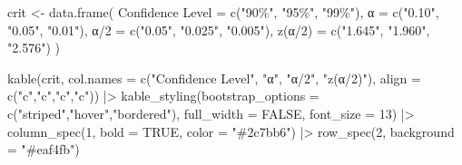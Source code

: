 \documentclass[
  12pt,
  letterpaper,
]{book}
\newenvironment{Shaded}{\begin{snugshade}}{\end{snugshade}}
\newcommand{\AttributeTok}[1]{\textcolor[rgb]{0.40,0.45,0.13}{#1}}
\newcommand{\ConstantTok}[1]{\textcolor[rgb]{0.56,0.35,0.01}{#1}}
\newcommand{\DecValTok}[1]{\textcolor[rgb]{0.68,0.00,0.00}{#1}}
\newcommand{\FunctionTok}[1]{\textcolor[rgb]{0.28,0.35,0.67}{#1}}
\newcommand{\NormalTok}[1]{\textcolor[rgb]{0.00,0.23,0.31}{#1}}
\newcommand{\OtherTok}[1]{\textcolor[rgb]{0.00,0.23,0.31}{#1}}
\newcommand{\SpecialCharTok}[1]{\textcolor[rgb]{0.37,0.37,0.37}{#1}}
\newcommand{\StringTok}[1]{\textcolor[rgb]{0.13,0.47,0.30}{#1}}
\begin{document}
\begin{Shaded}
\begin{Highlighting}[]
\NormalTok{crit }\OtherTok{\textless{}{-}} \FunctionTok{data.frame}\NormalTok{(}
  \StringTok{\textasciigrave{}}\AttributeTok{Confidence Level}\StringTok{\textasciigrave{}} \OtherTok{=} \FunctionTok{c}\NormalTok{(}\StringTok{"90\%"}\NormalTok{, }\StringTok{"95\%"}\NormalTok{, }\StringTok{"99\%"}\NormalTok{),}
  \StringTok{\textasciigrave{}}\AttributeTok{α}\StringTok{\textasciigrave{}} \OtherTok{=} \FunctionTok{c}\NormalTok{(}\StringTok{"0.10"}\NormalTok{, }\StringTok{"0.05"}\NormalTok{, }\StringTok{"0.01"}\NormalTok{),}
  \StringTok{\textasciigrave{}}\AttributeTok{α/2}\StringTok{\textasciigrave{}} \OtherTok{=} \FunctionTok{c}\NormalTok{(}\StringTok{"0.05"}\NormalTok{, }\StringTok{"0.025"}\NormalTok{, }\StringTok{"0.005"}\NormalTok{),}
  \StringTok{\textasciigrave{}}\AttributeTok{z(α/2)}\StringTok{\textasciigrave{}} \OtherTok{=} \FunctionTok{c}\NormalTok{(}\StringTok{"1.645"}\NormalTok{, }\StringTok{"1.960"}\NormalTok{, }\StringTok{"2.576"}\NormalTok{)}
\NormalTok{)}

\FunctionTok{kable}\NormalTok{(crit,}
      \AttributeTok{col.names =} \FunctionTok{c}\NormalTok{(}\StringTok{"Confidence Level"}\NormalTok{, }\StringTok{"α"}\NormalTok{, }\StringTok{"α/2"}\NormalTok{, }\StringTok{"z(α/2)"}\NormalTok{),}
      \AttributeTok{align =} \FunctionTok{c}\NormalTok{(}\StringTok{"c"}\NormalTok{,}\StringTok{"c"}\NormalTok{,}\StringTok{"c"}\NormalTok{,}\StringTok{"c"}\NormalTok{)) }\SpecialCharTok{|\textgreater{}}
  \FunctionTok{kable\_styling}\NormalTok{(}\AttributeTok{bootstrap\_options =} \FunctionTok{c}\NormalTok{(}\StringTok{"striped"}\NormalTok{,}\StringTok{"hover"}\NormalTok{,}\StringTok{"bordered"}\NormalTok{),}
                \AttributeTok{full\_width =} \ConstantTok{FALSE}\NormalTok{, }\AttributeTok{font\_size =} \DecValTok{13}\NormalTok{) }\SpecialCharTok{|\textgreater{}}
  \FunctionTok{column\_spec}\NormalTok{(}\DecValTok{1}\NormalTok{, }\AttributeTok{bold =} \ConstantTok{TRUE}\NormalTok{, }\AttributeTok{color =} \StringTok{"\#2c7bb6"}\NormalTok{) }\SpecialCharTok{|\textgreater{}}
  \FunctionTok{row\_spec}\NormalTok{(}\DecValTok{2}\NormalTok{, }\AttributeTok{background =} \StringTok{"\#eaf4fb"}\NormalTok{)}
\end{Highlighting}
\end{Shaded}

\begingroup\fontsize{13}{15}\selectfont
\end{document}
